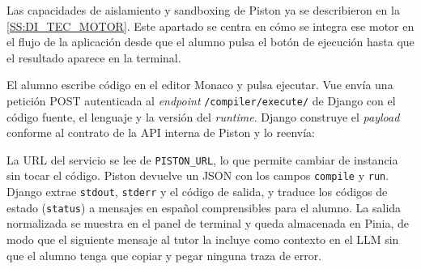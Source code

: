 Las capacidades de aislamiento y sandboxing de Piston ya se describieron en la \autoref{SS:DI_TEC_MOTOR}. Este apartado se centra en cómo se integra ese motor en el flujo de la aplicación desde que el alumno pulsa el botón de ejecución hasta que el resultado aparece en la terminal.

El alumno escribe código en el editor Monaco y pulsa ejecutar. Vue envía una petición POST autenticada al \textit{endpoint} \texttt{/compiler/execute/} de Django con el código fuente, el lenguaje y la versión del \textit{runtime}. Django construye el \textit{payload} conforme al contrato de la API interna de Piston y lo reenvía:


La URL del servicio se lee de \texttt{PISTON\_URL}, lo que permite cambiar de instancia sin tocar el código. Piston devuelve un JSON con los campos \texttt{compile} y \texttt{run}. Django extrae \texttt{stdout}, \texttt{stderr} y el código de salida, y traduce los códigos de estado (\texttt{status}) a mensajes en español comprensibles para el alumno. La salida normalizada se muestra en el panel de terminal y queda almacenada en Pinia, de modo que el siguiente mensaje al tutor la incluye como contexto en el LLM sin que el alumno tenga que copiar y pegar ninguna traza de error.
